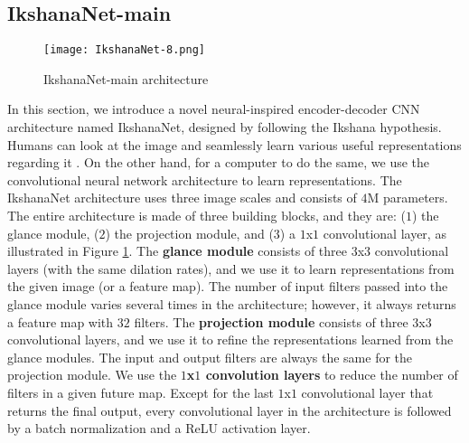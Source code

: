 \documentclass{article}
\begin{document}
\subsection{IkshanaNet-main}
\label{3.2}
\begin{figure}[ht]
\begin{center}
   \texttt{[image: IkshanaNet-8.png]}
\end{center}
   \caption{IkshanaNet-main architecture}
\label{fig:IkshanaNet}
\end{figure}


\noindent In this section, we introduce a novel neural-inspired encoder-decoder CNN architecture named IkshanaNet, designed by following the Ikshana hypothesis. Humans can look at the image and seamlessly learn various useful representations regarding it \cite{friedman1979framing,potter1976short,intraub1981rapid,oliva2001modeling}. On the other hand, for a computer to do the same, we use the convolutional neural network \cite{hubel1962receptive,fukushima1983neocognitron,lecun1998gradient} architecture to learn representations. The IkshanaNet architecture uses three image scales and consists of $4$M parameters. The entire architecture is made of three building blocks, and they are: ($1$) the glance module, ($2$) the projection module, and ($3$) a $1$x$1$ convolutional layer, as illustrated in Figure \ref{fig:IkshanaNet}.\newline
The \textbf{glance module} consists of three $3$x$3$ convolutional layers (with the same dilation rates), and we use it to learn representations from the given image (or a feature map). The number of input filters passed into the glance module varies several times in the architecture; however, it always returns a feature map with $32$ filters.
The \textbf{projection module} consists of three $3$x$3$ convolutional layers, and we use it to refine the representations learned from the glance modules. The input and output filters are always the same for the projection module.
We use the \textbf{$1$x$1$ convolution layers} to reduce the number of filters in a given future map. Except for the last $1$x$1$ convolutional layer that returns the final output, every  convolutional layer in the architecture is followed by a batch normalization \cite{ioffe2015batch} and a ReLU \cite{nair2010rectified} activation layer. \newline 
\end{document}
